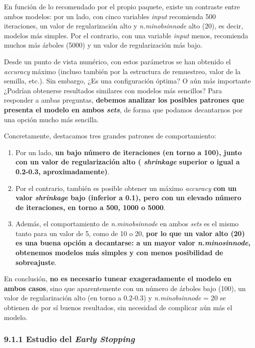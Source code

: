 \documentclass[
]{article}
\begin{document}
En función de lo recomendado por el propio paquete, existe un contraste
entre ambos modelos: por un lado, con cinco variables \emph{input}
recomienda 500 iteraciones, un valor de regularización alto y
\emph{n.minobsinnode} alto (20), es decir, modelos más simples. Por el
contrario, con una variable \emph{input} menos, recomienda muchos más
árboles (5000) y un valor de regularización más bajo.

Desde un punto de vista numérico, con estos parámetros se han obtenido
el \emph{accuracy} máximo (incluso también por la estructura de
remuestreo, valor de la semilla, etc.). Sin embargo, ¿Es una
configuración óptima? O aún más importante ¿Podrían obtenerse resultados
similares con modelos más sencillos? Para responder a ambas preguntas,
\textbf{debemos analizar los posibles patrones que presenta el modelo en
ambos \emph{sets}}, de forma que podamos decantarnos por una opción
mucho más sencilla.

Concretamente, destacamos tres grandes patrones de comportamiento:

\begin{enumerate}
\def\labelenumi{\arabic{enumi}.}
\item
  Por un lado, \textbf{un bajo número de iteraciones (en torno a 100),
  junto con un valor de regularización alto ( \emph{shrinkage} superior
  o igual a 0.2-0.3, aproximadamente)}.
\item
  Por el contrario, también es posible obtener un máximo \emph{accuracy}
  \textbf{con un valor \emph{shrinkage} bajo (inferior a 0.1), pero con
  un elevado número de iteraciones, en torno a 500, 1000 o 5000}.
\item
  Además, el comportamiento de \emph{n.minobsinnode} en ambos
  \emph{sets} es el mismo tanto para un valor de 5, como de 10 o 20,
  \textbf{por lo que un valor alto (20) es una buena opción a
  decantarse: a un mayor valor \emph{n.minosinnode}, obtenemos modelos
  más simples y con menos posibilidad de sobreajuste}.
\end{enumerate}

En conclusión, \textbf{no es necesario tunear exageradamente el modelo
en ambos casos}, sino que aparentemente con un número de árboles bajo
(100), un valor de regularización alto (en torno a 0.2-0.3) y
\emph{n.minobsinnode} = 20 se obtienen de por sí buenos resultados, sin
necesidad de complicar aún más el modelo.

\hypertarget{estudio-del-early-stopping}{%
\subsubsection{\texorpdfstring{9.1.1 Estudio del \emph{Early
Stopping}}{9.1.1 Estudio del Early Stopping}}\label{estudio-del-early-stopping}}
\end{document}
